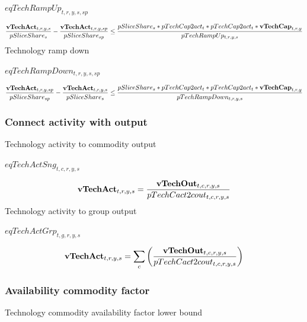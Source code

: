 \documentclass{article}
\begin{document}
$eqTechRampUp_{t,r,y,s,sp}$





\begin{dmath} 
\frac{{\bf vTechAct}_{t,r,y,s}}{pSliceShare_{s}}-\frac{{\bf vTechAct}_{t,r,y,sp}}{pSliceShare_{sp}}  \le  \frac{pSliceShare_{s}*pTechCap2act_{t}*pTechCap2act_{t}*{\bf vTechCap}_{t,r,y}}{pTechRampUp_{t,r,y,s}}
\end{dmath} 
Technology ramp down







$eqTechRampDown_{t,r,y,s,sp}$





\begin{dmath} 
\frac{{\bf vTechAct}_{t,r,y,sp}}{pSliceShare_{sp}}-\frac{{\bf vTechAct}_{t,r,y,s}}{pSliceShare_{s}}  \le  \frac{pSliceShare_{s}*pTechCap2act_{t}*pTechCap2act_{t}*{\bf vTechCap}_{t,r,y}}{pTechRampDown_{t,r,y,s}}
\end{dmath} 
\subsubsection*{Connect activity with output}
Technology activity to commodity output







$eqTechActSng_{t,c,r,y,s}$





\begin{dmath} 
{\bf vTechAct}_{t,r,y,s}  =  \frac{{\bf vTechOut}_{t,c,r,y,s}}{pTechCact2cout_{t,c,r,y,s}}
\end{dmath} 
Technology activity to group output







$eqTechActGrp_{t,g,r,y,s}$





\begin{dmath} 
{\bf vTechAct}_{t,r,y,s}  =  \sum_{c}{\left(\frac{{\bf vTechOut}_{t,c,r,y,s}}{pTechCact2cout_{t,c,r,y,s}}\right)}
\end{dmath} 
\subsubsection*{Availability commodity factor}
Technology commodity availability factor lower bound
\end{document}
